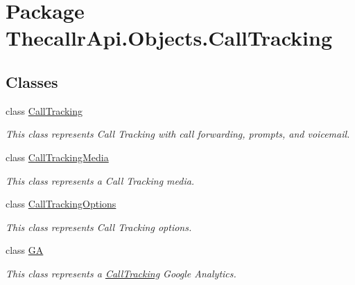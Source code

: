 \hypertarget{namespace_thecallr_api_1_1_objects_1_1_call_tracking}{\section{Package Thecallr\+Api.\+Objects.\+Call\+Tracking}
\label{namespace_thecallr_api_1_1_objects_1_1_call_tracking}
}
\subsection*{Classes}
\begin{DoxyCompactItemize}
\item 
class \hyperlink{class_thecallr_api_1_1_objects_1_1_call_tracking_1_1_call_tracking}{Call\+Tracking}
\begin{DoxyCompactList}\small\item\em This class represents Call Tracking with call forwarding, prompts, and voicemail. \end{DoxyCompactList}\item 
class \hyperlink{class_thecallr_api_1_1_objects_1_1_call_tracking_1_1_call_tracking_media}{Call\+Tracking\+Media}
\begin{DoxyCompactList}\small\item\em This class represents a Call Tracking media. \end{DoxyCompactList}\item 
class \hyperlink{class_thecallr_api_1_1_objects_1_1_call_tracking_1_1_call_tracking_options}{Call\+Tracking\+Options}
\begin{DoxyCompactList}\small\item\em This class represents Call Tracking options. \end{DoxyCompactList}\item 
class \hyperlink{class_thecallr_api_1_1_objects_1_1_call_tracking_1_1_g_a}{G\+A}
\begin{DoxyCompactList}\small\item\em This class represents a \hyperlink{class_thecallr_api_1_1_objects_1_1_call_tracking_1_1_call_tracking}{Call\+Tracking} Google Analytics. \end{DoxyCompactList}\end{DoxyCompactItemize}
